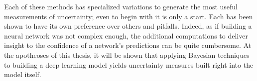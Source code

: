 Each of these methods has specialized variations to generate the most useful measurements of uncertainty; even to begin with it is only a start.  Each has been shown to have its own preference over others and pitfalls.  Indeed, as if building a neural network was not complex enough, the additional computations to deliver insight to the confidence of a network's predictions can be quite cumbersome. At the apotheoses of this thesis, it will be shown that applying Bayesian techniques to building a deep learning model yields uncertainty measures built right into the model itself.

